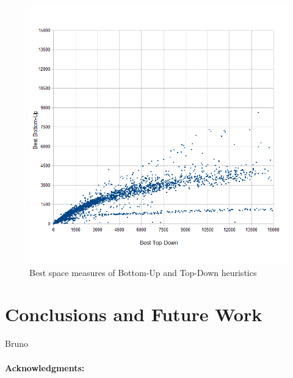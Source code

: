 \documentclass{llncs}
\begin{document}
\begin{figure}[tb]
	\centering
	\includegraphics[scale=0.5]{Figures/TD_vs_BU-scatter_min.png}
	\caption{Best space measures of Bottom-Up and Top-Down heuristics}
	\label{fig:BUvsTD}
\end{figure}

\section{Conclusions and Future Work}

Bruno


\vspace{-10pt}
\paragraph{Acknowledgments:}



\end{document}
